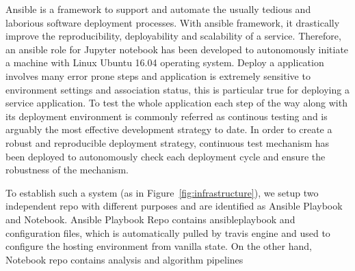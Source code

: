 Ansible is a framework to support and automate the usually tedious and laborious software deployment processes. With ansible framework, it drastically improve the reproducibility, deployability and scalability of a service. Therefore, 
an ansible role for Jupyter notebook has been developed to autonomously initiate a machine with Linux Ubuntu 16.04 operating system. 
Deploy a application involves many error prone steps and application is extremely sensitive to environment settings and association status, this is particular true for deploying a service application. To test the whole application each step of the way along with its deployment environment is commonly referred as continous testing and is arguably the most effective development strategy to date. In order to create a robust and reproducible deployment strategy, continuous test mechanism has been deployed to autonomously check each deployment cycle and ensure the robustness of the mechanism. 

To establish such a system (as in Figure~\ref{fig:infrastructure}), we setup two independent repo with different purposes and are identified as Ansible Playbook and Notebook.  Ansible Playbook Repo contains ansible\textcopyright playbook and configuration files, which is automatically pulled by travis engine and used to configure the hosting environment from vanilla state. On the other hand, Notebook repo contains analysis and algorithm pipelines 